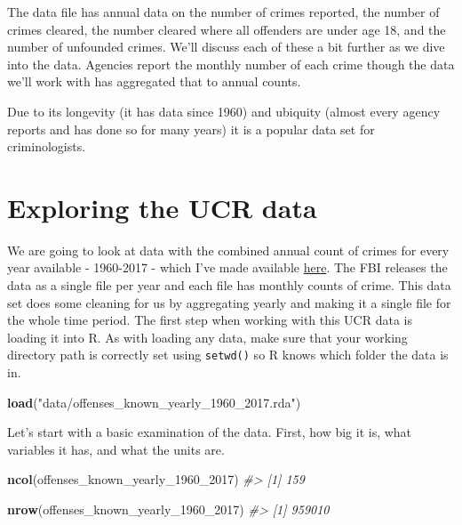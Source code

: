 \documentclass[
  12pt,
]{book}
\newenvironment{Shaded}{\begin{snugshade}}{\end{snugshade}}
\newcommand{\CommentTok}[1]{\textcolor[rgb]{0.37,0.37,0.37}{\textit{#1}}}
\newcommand{\DecValTok}[1]{\textcolor[rgb]{0.06,0.06,0.06}{#1}}
\newcommand{\KeywordTok}[1]{\textcolor[rgb]{0.27,0.27,0.27}{\textbf{#1}}}
\newcommand{\NormalTok}[1]{#1}
\newcommand{\StringTok}[1]{\textcolor[rgb]{0.5,0.5,0.5}{#1}}
\begin{document}
The data file has annual data on the number of crimes reported, the number of crimes cleared, the number cleared where all offenders are under age 18, and the number of unfounded crimes. We'll discuss each of these a bit further as we dive into the data. Agencies report the monthly number of each crime though the data we'll work with has aggregated that to annual counts.

Due to its longevity (it has data since 1960) and ubiquity (almost every agency reports and has done so for many years) it is a popular data set for criminologists.

\hypertarget{exploring-the-ucr-data}{%
\section{Exploring the UCR data}\label{exploring-the-ucr-data}}

We are going to look at data with the combined annual count of crimes for every year available - 1960-2017 - which I've made available \href{http://doi.org/10.3886/E100707V11}{here}. The FBI releases the data as a single file per year and each file has monthly counts of crime. This data set does some cleaning for us by aggregating yearly and making it a single file for the whole time period. The first step when working with this UCR data is loading it into R. As with loading any data, make sure that your working directory path is correctly set using \texttt{setwd()} so R knows which folder the data is in.

\begin{Shaded}
\begin{Highlighting}[]
\KeywordTok{load}\NormalTok{(}\StringTok{"data/offenses\_known\_yearly\_1960\_2017.rda"}\NormalTok{)}
\end{Highlighting}
\end{Shaded}

Let's start with a basic examination of the data. First, how big it is, what variables it has, and what the units are.

\begin{Shaded}
\begin{Highlighting}[]
\KeywordTok{ncol}\NormalTok{(offenses\_known\_yearly\_}\DecValTok{1960}\NormalTok{\_}\DecValTok{2017}\NormalTok{)}
\CommentTok{\#> [1] 159}
\end{Highlighting}
\end{Shaded}

\begin{Shaded}
\begin{Highlighting}[]
\KeywordTok{nrow}\NormalTok{(offenses\_known\_yearly\_}\DecValTok{1960}\NormalTok{\_}\DecValTok{2017}\NormalTok{)}
\CommentTok{\#> [1] 959010}
\end{Highlighting}
\end{Shaded}
\end{document}
